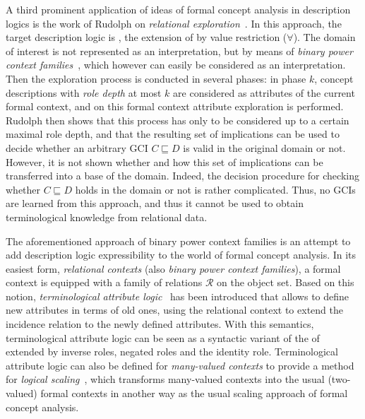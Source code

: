 A third prominent application of ideas of formal concept analysis in description logics is
the work of Rudolph on \emph{relational
  exploration}~\cite{DBLP:phd/de/Rudolph2006,conf/iccs/Rudolph04}.  In this approach, the
target description logic is \FLE, the extension of \EL by value restriction ($\forall$).
The domain of interest is not represented as an interpretation, but by means of
\emph{binary power context families}~\cite{DBLP:conf/iccs/PredigerW99}, which however can
easily be considered as an interpretation.  Then the exploration process is conducted in
several phases: in phase $k$, concept descriptions with \emph{role depth} at most $k$ are
considered as attributes of the current formal context, and on this formal context
attribute exploration is performed.  Rudolph then shows that this process has only to be
considered up to a certain maximal role depth, and that the resulting set of implications
can be used to decide whether an arbitrary GCI $C \sqsubseteq D$ is valid in the original
domain or not.  However, it is not shown whether and how this set of implications can be
transferred into a base of the domain.  Indeed, the decision procedure for checking
whether $C \sqsubseteq D$ holds in the domain or not is rather complicated.  Thus, no GCIs
are learned from this approach, and thus it cannot be used to obtain terminological
knowledge from relational data.

The aforementioned approach of binary power context families is an attempt to add
description logic expressibility to the world of formal concept analysis.  In its easiest
form, \emph{relational contexts} (also \emph{binary power context families}), a formal
context is equipped with a family of relations $\mathcal{R}$ on the object set.  Based on
this notion, \emph{terminological attribute logic}~\cite{books/math/Prediger00} has been
introduced that allows to define new attributes in terms of old ones, using the relational
context to extend the incidence relation to the newly defined attributes.  With this
semantics, terminological attribute logic can be seen as a syntactic variant of the of
\ALC extended by inverse roles, negated roles and the identity role.  Terminological
attribute logic can also be defined for \emph{many-valued contexts} to provide a method
for \emph{logical scaling}~\cite{conf/krdb/PredigerS99}, which transforms many-valued
contexts into the usual (two-valued) formal contexts in another way as the usual scaling
approach of formal concept analysis.

